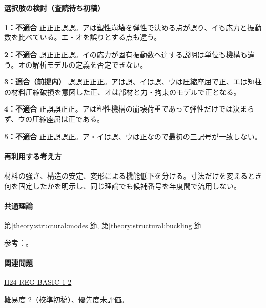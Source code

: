 \paragraph{選択肢の検討（査読待ち初稿）}\mbox{}\par

\noindent\textbf{1：不適合} 正正正誤誤。アは塑性崩壊を弾性で決める点が誤り、イも応力と振動数を比べている。エ・オを誤りとする点も違う。\par

\noindent\textbf{2：不適合} 誤正正正誤。イの応力が固有振動数へ達する説明は単位も機構も違う。オの解析モデルの定義を否定できない。\par

\noindent\textbf{3：適合（前提内）} 誤誤正正正。アは誤、イは誤、ウは圧縮座屈で正、エは短柱の材料圧縮破損を意図した正、オは部材と力・拘束のモデルで正となる。\par

\noindent\textbf{4：不適合} 正誤誤正正。アは塑性機構の崩壊荷重であって弾性だけでは決まらず、ウの圧縮座屈は正である。\par

\noindent\textbf{5：不適合} 正正誤誤正。ア・イは誤、ウは正なので最初の三記号が一致しない。\par

\paragraph{再利用する考え方} 材料の強さ、構造の安定、変形による機能低下を分ける。寸法だけを変えるとき何を固定したかを明示し、同じ理論でも候補番号を年度間で流用しない。

\paragraph{共通理論} \hyperref[theory:structural:modes]{第\ref*{theory:structural:modes}節}, \hyperref[theory:structural:buckling]{第\ref*{theory:structural:buckling}節}

\par 参考：\cite{struct_mit_beam,struct_mit_buckling,struct_mlit_limit}。

\paragraph{関連問題} \hyperref[q:h24-reg-basic-1-2]{H24-REG-BASIC-1-2}

\par 難易度 2（校準初稿）、優先度未評価。

